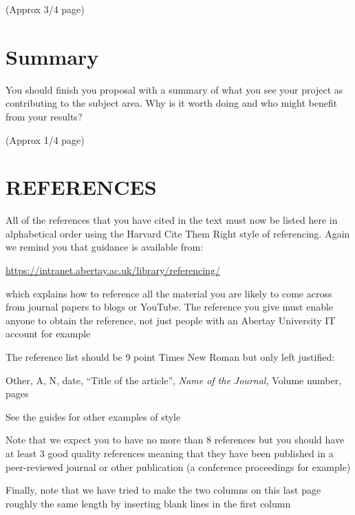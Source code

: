 \documentclass[9pt]{extarticle} %
\begin{document}
\begin{multicols}{2}
(Approx 3/4 page)

\section{Summary}

You should finish you proposal with a summary of what you see your project as contributing to the subject area. Why is it worth doing and who might benefit from your results?

(Approx 1/4 page)

\section{REFERENCES}

All of the references that you have cited in the text must now be listed here in alphabetical order using the Harvard Cite Them Right style of referencing. Again we remind you that guidance is available from: 

\noindent \url{https://intranet.abertay.ac.uk/library/referencing/}

which explains how to reference all the material you are likely to come across from journal papers to blogs or YouTube. The reference you give must enable anyone to obtain the reference, not just people with an Abertay University IT account for example

The reference list should be 9 point Times New Roman but only left justified:

Other, A, N, date, ``Title of the article'', \textit{Name of the Journal,} Volume number, pages

See the guides for other examples of style

Note that we expect you to have no more than 8 references but you should have at least 3 good quality references meaning that they have been published in a peer-reviewed journal or other publication (a conference proceedings for example)

Finally, note that we have tried to make the two columns on this last page roughly the same length by inserting blank lines in the first column

\end{multicols}
\end{document}
